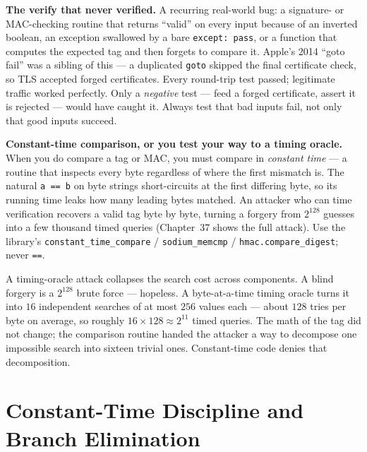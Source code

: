 \begin{attackbox}
\textbf{The verify that never verified.} A recurring real-world bug: a signature- or
MAC-checking routine that returns ``valid'' on every input because of an inverted
boolean, an exception swallowed by a bare \texttt{except: pass}, or a function that
computes the expected tag and then forgets to compare it. Apple's 2014
``goto fail'' was a sibling of this --- a duplicated \texttt{goto} skipped the final
certificate check, so TLS accepted forged certificates. Every round-trip test
passed; legitimate traffic worked perfectly. Only a \emph{negative} test --- feed a
forged certificate, assert it is rejected --- would have caught it. Always test that
bad inputs fail, not only that good inputs succeed.
\end{attackbox}

\begin{trapbox}
\textbf{Constant-time comparison, or you test your way to a timing oracle.} When you
do compare a tag or MAC, you must compare in \emph{constant time} --- a routine that
inspects every byte regardless of where the first mismatch is. The natural
\texttt{a == b} on byte strings short-circuits at the first differing byte, so its
running time leaks how many leading bytes matched. An attacker who can time
verification recovers a valid tag byte by byte, turning a forgery from $2^{128}$
guesses into a few thousand timed queries (Chapter~37 shows the full
attack). Use the library's \texttt{constant\_time\_compare} /
\texttt{sodium\_memcmp} / \texttt{hmac.compare\_digest}; never \texttt{==}.
\end{trapbox}

\begin{connectionbox}
A timing-oracle attack collapses the search cost across components. A blind forgery is a $2^{128}$ brute force --- hopeless. A
byte-at-a-time timing oracle turns it into $16$ independent searches of at most
$256$ values each --- about $128$ tries per byte on average, so roughly
$16 \times 128 \approx 2^{11}$ timed queries. The math of the
tag did not change; the comparison routine handed the attacker a way to decompose
one impossible search into sixteen trivial ones. Constant-time code denies that
decomposition.
\end{connectionbox}

\section{Constant-Time Discipline and Branch Elimination}
\label{ch39:constant-time}

